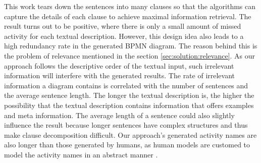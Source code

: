 This work tears down the sentences into many clauses so that the algorithms can capture the details of each clause to achieve maximal information retrieval. The result turns out to be positive, where there is only a small amount of missed activity for each textual description. However, this design idea also leads to a high redundancy rate in the generated BPMN diagram. The reason behind this is the problem of relevance mentioned in the section \ref{sec:solution:relevance}. As our approach follows the descriptive order of the textual input, such irrelevant information will interfere with the generated results. The rate of irrelevant information a diagram contains is correlated with the number of sentences and the average sentence length. The longer the textual description is, the higher the possibility that the textual description contains information that offers examples and meta information. The average length of a sentence could also slightly influence the result because longer sentences have complex structures and thus make clause decomposition difficult. Our approach's generated activity names are also longer than those generated by humans, as human models are customed to model the activity names in an abstract manner \cite{t2m_1_main}. 


